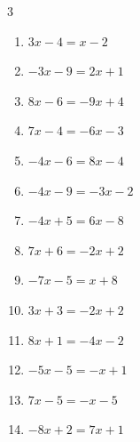 \begin{multicols}{3}
\begin{enumerate}
  \item $3x-4=x-2$

        \phantom{$\displaystyle x=1$}

  \item $-3x-9=2x+1$

        \phantom{$\displaystyle x=-2$}

  \item $8x-6=-9x+4$


  \item $7x-4=-6x-3$


  \item $-4x-6=8x-4$


  \item $-4x-9=-3x-2$

        \phantom{$\displaystyle x=-7$}

  \item $-4x+5=6x-8$


  \item $7x+6=-2x+2$


  \item $-7x-5=x+8$


  \item $3x+3=-2x+2$


  \item $8x+1=-4x-2$


  \item $-5x-5=-x+1$


  \item $7x-5=-x-5$

        \phantom{$\displaystyle x=0$}

  \item $-8x+2=7x+1$



\end{enumerate}
\end{multicols}
